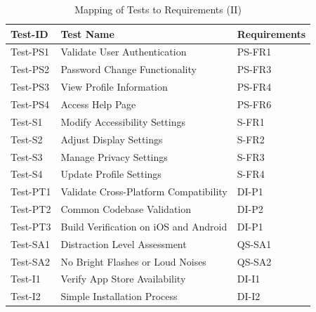 \documentclass[12pt, titlepage]{article}
\begin{document}
\begin{table}[htpb!]
  \centering
  \begin{tabular}{|l|p{8cm}|p{3cm}|}
    \hline
    \textbf{Test-ID} & \textbf{Test Name}                    & \textbf{Requirements} \\
    \hline
    Test-PS1         & Validate User Authentication          & PS-FR1                \\
    \hline
    Test-PS2         & Password Change Functionality         & PS-FR3                \\
    \hline
    Test-PS3         & View Profile Information              & PS-FR4                \\
    \hline
    Test-PS4         & Access Help Page                      & PS-FR6                \\
    \hline
    Test-S1          & Modify Accessibility Settings         & S-FR1                 \\
    \hline
    Test-S2          & Adjust Display Settings               & S-FR2                 \\
    \hline
    Test-S3          & Manage Privacy Settings               & S-FR3                 \\
    \hline
    Test-S4          & Update Profile Settings               & S-FR4                 \\
    \hline
    Test-PT1         & Validate Cross-Platform Compatibility & DI-P1                 \\
    \hline
    Test-PT2         & Common Codebase Validation            & DI-P2                 \\
    \hline
    Test-PT3         & Build Verification on iOS and Android & DI-P1                 \\
    \hline
    Test-SA1         & Distraction Level Assessment          & QS-SA1                \\
    \hline
    Test-SA2         & No Bright Flashes or Loud Noises      & QS-SA2                \\
    \hline
    Test-I1          & Verify App Store Availability         & DI-I1                 \\
    \hline
    Test-I2          & Simple Installation Process           & DI-I2                 \\
    \hline
  \end{tabular}
  \caption{Mapping of Tests to Requirements (II)}
  \label{tab:test_requirements2}
\end{table}
\end{document}
